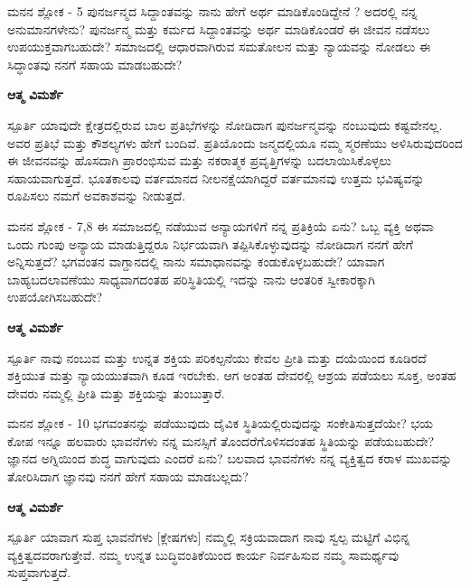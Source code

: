 \newpage
\begin{mananam}{\mananamfont ಮನನ ಶ್ಲೋಕ - \textenglish{5}}
\footnotesize \mananamtext ಪುನರ್ಜನ್ಮದ ಸಿದ್ದಾಂತವನ್ನು ನಾನು ಹೇಗೆ ಅರ್ಥ ಮಾಡಿಕೊಂಡಿದ್ದೇನೆ ? ಅದರಲ್ಲಿ ನನ್ನ ಅನುಮಾನಗಳೇನು?  ಪುನರ್ಜನ್ಮ ಮತ್ತು ಕರ್ಮದ ಸಿದ್ದಾಂತವನ್ನು ಅರ್ಥ ಮಾಡಿಕೊಂಡರೆ ಈ ಜೀವನ ನಡೆಸಲು ಉಪಯುಕ್ತವಾಗಬಹುದೇ? ಸಮಾಜದಲ್ಲಿ ಆಧಾರವಾಗಿರುವ ಸಮತೋಲನ ಮತ್ತು ನ್ಯಾಯವನ್ನು ನೋಡಲು ಈ ಸಿದ್ಧಾಂತವು ನನಗೆ ಸಹಾಯ ಮಾಡಬಹುದೇ?
\end{mananam}
\WritingHand\enspace\textbf{ಆತ್ಮ ವಿಮರ್ಶೆ}\\
\begin{inspiration}{\mananamfont ಸ್ಪೂರ್ತಿ}
\footnotesize \mananamtext ಯಾವುದೇ ಕ್ಷೇತ್ರದಲ್ಲಿರುವ ಬಾಲ ಪ್ರತಿಭೆಗಳನ್ನು ನೋಡಿದಾಗ ಪುನರ್ಜನ್ಮವನ್ನು ನಂಬುವುದು ಕಷ್ಟವೇನಲ್ಲ. ಅವರ ಪ್ರತಿಭೆ ಮತ್ತು ಕೌಶಲ್ಯಗಳು ಹೇಗೆ ಬಂದಿವೆ. ಪ್ರತಿಯೊಂದು ಜನ್ಮದಲ್ಲಿಯೂ ನಮ್ಮ ಸ್ಮರಣೆಯು ಅಳಿಸಿರುವುದರಿಂದ ಈ ಜೀವನವನ್ನು ಹೊಸದಾಗಿ ಪ್ರಾರಂಭಿಸುವ ಮತ್ತು ನಕರಾತ್ಮಕ ಪ್ರವೃತ್ತಿಗಳನ್ನು ಬದಲಾಯಿಸಿಕೊಳ್ಳಲು ಸಹಾಯವಾಗುತ್ತದೆ. ಭೂತಕಾಲವು ವರ್ತಮಾನದ ನೀಲನಕ್ಷೆಯಾಗಿದ್ದರೆ ವರ್ತಮಾನವು ಉತ್ತಮ ಭವಿಷ್ಯವನ್ನು ರೂಪಿಸಲು ನಮಗೆ ಅವಕಾಶವನ್ನು ನೀಡುತ್ತದೆ.\\
\end{inspiration}
\newpage
\newpage
\begin{mananam}{\mananamfont ಮನನ ಶ್ಲೋಕ - \textenglish{7,8}}
\footnotesize \mananamtext ಈ ಸಮಾಜದಲ್ಲಿ ನಡೆಯುವ ಅನ್ಯಾಯಗಳಿಗೆ ನನ್ನ ಪ್ರತಿಕ್ರಿಯೆ ಏನು? ಒಬ್ಬ ವ್ಯಕ್ತಿ ಅಥವಾ ಒಂದು ಗುಂಪು ಅನ್ಯಾಯ ಮಾಡುತ್ತಿದ್ದರೂ ನಿರ್ಭಯವಾಗಿ ತಪ್ಪಿಸಿಕೊಳ್ಳುವುದನ್ನು ನೋಡಿದಾಗ ನನಗೆ ಹೇಗೆ ಅನ್ನಿಸುತ್ತದೆ? ಭಗವಂತನ  ವಾಗ್ದಾನದಲ್ಲಿ ನಾನು ಸಮಾಧಾನವನ್ನು ಕಂಡುಕೊಳ್ಳಬಹುದೇ? ಯಾವಾಗ ಬಾಹ್ಯಬದಲಾವಣೆಯು ಸಾಧ್ಯವಾಗದಂತಹ ಪರಿಸ್ಥಿತಿಯಲ್ಲಿ ಇದನ್ನು ನಾನು ಆಂತರಿಕ ಸ್ವೀಕಾರಕ್ಕಾಗಿ ಉಪಯೋಗಿಸಬಹುದೇ?
\end{mananam}
\WritingHand\enspace\textbf{ಆತ್ಮ ವಿಮರ್ಶೆ}\\
\begin{inspiration}{\mananamfont ಸ್ಪೂರ್ತಿ}
\footnotesize \mananamtext ನಾವು ನಂಬುವ ಮತ್ತು ಉನ್ನತ ಶಕ್ತಿಯ ಪರಿಕಲ್ಪನೆಯು ಕೇವಲ ಪ್ರೀತಿ ಮತ್ತು ದಯೆಯಿಂದ ಕೂಡಿರದೆ ಶಕ್ತಿಯುತ ಮತ್ತು ನ್ಯಾಯಯುತವಾಗಿ ಕೂಡ ಇರಬೇಕು. ಆಗ ಅಂತಹ ದೇವರಲ್ಲಿ ಆಶ್ರಯ ಪಡೆಯಲು  ಸೂಕ್ತ, ಅಂತಹ ದೇವರು ನಮ್ಮಲ್ಲಿ ಪ್ರೀತಿ ಮತ್ತು ಶಕ್ತಿಯನ್ನು ತುಂಬುತ್ತಾರೆ.
\end{inspiration}
\newpage

\begin{mananam}{\mananamfont ಮನನ ಶ್ಲೋಕ - \textenglish{10}}
\footnotesize \mananamtext ಭಗವಂತನನ್ನು ಪಡೆಯುವುದು ದೈವಿಕ ಸ್ಥಿತಿಯಲ್ಲಿರುವುದನ್ನು ಸಂಕೇತಿಸುತ್ತದೆಯೇ? ಭಯ ಕೋಪ ಇನ್ನೂ ಹಲವಾರು ಭಾವನೆಗಳು ನನ್ನ ಮನಸ್ಸಿಗೆ ತೊಂದರೆಗೊಳಿಸದಂತಹ ಸ್ಥಿತಿಯನ್ನು ಪಡೆಯಬಹುದೇ? ಜ್ಞಾನದ ಅಗ್ನಿಯಿಂದ ಶುದ್ಧ ವಾಗುವುದು ಎಂದರೆ ಏನು? ಬಲವಾದ ಭಾವನೆಗಳು ನನ್ನ ವ್ಯಕ್ತಿತ್ವದ ಕರಾಳ ಮುಖವನ್ನು ತೋರಿಸಿದಾಗ ಜ್ಞಾನವು ನನಗೆ ಹೇಗೆ ಸಹಾಯ ಮಾಡಬಲ್ಲದು?
\end{mananam}
\WritingHand\enspace\textbf{ಆತ್ಮ ವಿಮರ್ಶೆ}\\
\begin{inspiration}{\mananamfont ಸ್ಪೂರ್ತಿ}
\footnotesize \mananamtext ಯಾವಾಗ ಸುಪ್ತ ಭಾವನೆಗಳು [ಕ್ಲೇಷಗಳು] ನಮ್ಮಲ್ಲಿ ಸಕ್ರಿಯವಾದಾಗ ನಾವು ಸ್ವಲ್ಪ ಮಟ್ಟಿಗೆ ವಿಭಿನ್ನ ವ್ಯಕ್ತಿತ್ವದವರಾಗುತ್ತೇವೆ. ನಮ್ಮ ಉನ್ನತ ಬುದ್ಧಿವಂತಿಕೆಯಿಂದ ಕಾರ್ಯ ನಿರ್ವಹಿಸುವ ನಮ್ಮ  ಸಾಮರ್ಥ್ಯವು ಸುಪ್ತವಾಗುತ್ತದೆ.
\end{inspiration}
\newpage

